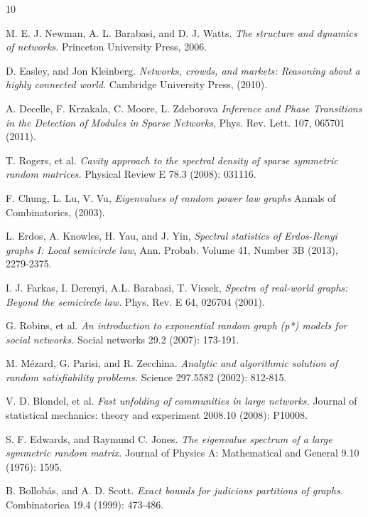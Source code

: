 \documentclass[%
 reprint,
 amsmath,amssymb,
 aps,
 pre,
 showpacs
]{revtex4-1}
\begin{document}
\begin{thebibliography}{10}

M. E. J. Newman, A. L. Barabasi, and D. J. Watts.
\textit{The structure and dynamics of networks.} Princeton University
Press, 2006.

D. Easley, and Jon Kleinberg. \textit{Networks, crowds, and markets: Reasoning about a highly connected world.} Cambridge University Press, (2010).

A. Decelle, F. Krzakala, C. Moore, L. Zdeborova \textit{Inference
and Phase Transitions in the Detection of Modules in Sparse Networks},
Phys. Rev. Lett. 107, 065701 (2011).

T. Rogers, et al. \textit{Cavity approach to the spectral density of sparse symmetric random matrices.} Physical Review E 78.3 (2008): 031116.

F. Chung, L. Lu, V. Vu, \textit{Eigenvalues of random
power law graphs} Annals of Combinatorics, (2003).

 L. Erdos, A. Knowles, H. Yau, and J. Yin, \textit{Spectral
statistics of Erdos-Renyi graphs I: Local semicircle law}, Ann. Probab.
Volume 41, Number 3B (2013), 2279-2375.

 I. J. Farkas, I. Derenyi, A.L. Barabasi, T. Vicsek,
\textit{Spectra of real-world graphs: Beyond the semicircle law.}
Phys. Rev. E 64, 026704 (2001).

G. Robins, et al. \textit{An introduction to exponential random graph (p*) models for social networks.} Social networks 29.2 (2007): 173-191.

M. M\'ezard, G. Parisi, and R. Zecchina. \textit{Analytic and algorithmic solution of random satisfiability problems.} Science 297.5582 (2002): 812-815.

V. D. Blondel, et al. \textit{Fast unfolding of communities in large networks.} Journal of statistical mechanics: theory and experiment 2008.10 (2008): P10008.

S. F. Edwards, and Raymund C. Jones. \textit{The eigenvalue spectrum of a large symmetric random matrix.} Journal of Physics A: Mathematical and General 9.10 (1976): 1595.

B. Bollob\'as, and A. D. Scott. \textit{Exact bounds for judicious partitions of graphs.} Combinatorica 19.4 (1999): 473-486.


\end{thebibliography}
\end{document}
